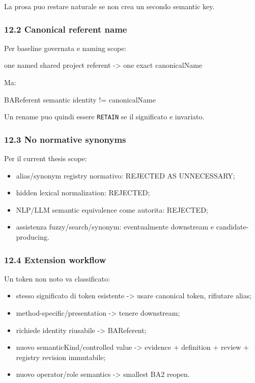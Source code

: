 \documentclass[
  9pt,
  a4paper,
]{article}
\newenvironment{Shaded}{}{}
\newcommand{\NormalTok}[1]{#1}
\providecommand{\tightlist}{%
  \setlength{\itemsep}{0pt}\setlength{\parskip}{0pt}}
\begin{document}
La prosa puo restare naturale se non crea un secondo semantic key.

\subsubsection{12.2 Canonical referent
name}\label{canonical-referent-name}

Per baseline governata e naming scope:

\begin{Shaded}
\begin{Highlighting}[]
\NormalTok{one named shared project referent {-}\textgreater{} one exact canonicalName}
\end{Highlighting}
\end{Shaded}

Ma:

\begin{Shaded}
\begin{Highlighting}[]
\NormalTok{BAReferent semantic identity != canonicalName}
\end{Highlighting}
\end{Shaded}

Un rename puo quindi essere \texttt{RETAIN} se il significato e
invariato.

\subsubsection{12.3 No normative synonyms}\label{no-normative-synonyms}

Per il current thesis scope:

\begin{itemize}
\tightlist
\item
  alias/synonym registry normativo: REJECTED AS UNNECESSARY;
\item
  hidden lexical normalization: REJECTED;
\item
  NLP/LLM semantic equivalence come autorita: REJECTED;
\item
  assistenza fuzzy/search/synonym: eventualmente downstream e
  candidate-producing.
\end{itemize}

\subsubsection{12.4 Extension workflow}\label{extension-workflow}

Un token non noto va classificato:

\begin{itemize}
\tightlist
\item
  stesso significato di token esistente -\textgreater{} usare canonical
  token, rifiutare alias;
\item
  method-specific/presentation -\textgreater{} tenere downstream;
\item
  richiede identity riusabile -\textgreater{} BAReferent;
\item
  nuovo semanticKind/controlled value -\textgreater{} evidence +
  definition + review + registry revision immutabile;
\item
  nuovo operator/role semantics -\textgreater{} smallest BA2 reopen.
\end{itemize}
\end{document}
